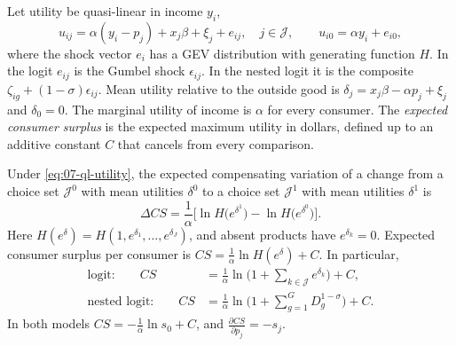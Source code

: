 Let utility be quasi-linear in income $y_i$,
\begin{equation}\label{eq:07-ql-utility}
u_{ij} = \alpha(y_i - p_j) + x_j\beta + \xi_j + e_{ij}, \quad j \in \mathcal{J}, \qquad u_{i0} = \alpha y_i + e_{i0} ,
\end{equation}
where the shock vector $e_i$ has a GEV distribution with generating function $H$. In the logit $e_{ij}$ is the
Gumbel shock $\epsilon_{ij}$. In the nested logit it is the composite $\zeta_{ig} + (1-\sigma)\epsilon_{ij}$. Mean
utility relative to the outside good is $\delta_j = x_j\beta - \alpha p_j + \xi_j$ and $\delta_0 = 0$. The marginal
utility of income is $\alpha$ for every consumer. The \emph{expected consumer surplus} is the expected maximum utility
in dollars, defined up to an additive constant $C$ that cancels from every comparison.

\begin{proposition}\label{prop:07-logsum}
Under \eqref{eq:07-ql-utility}, the expected compensating variation of a change from a choice set
$\mathcal{J}^0$ with mean utilities $\delta^0$ to a choice set $\mathcal{J}^1$ with mean utilities $\delta^1$ is
\begin{equation}\label{eq:07-dcs}
\Delta CS = \frac{1}{\alpha}\Big[\ln H\big(e^{\delta^1}\big) - \ln H\big(e^{\delta^0}\big)\Big].
\end{equation}
Here $H(e^{\delta}) = H(1, e^{\delta_1}, \dots, e^{\delta_J})$, and absent products have $e^{\delta_k} = 0$. Expected
consumer surplus per consumer is $CS = \frac{1}{\alpha}\ln H(e^{\delta}) + C$. In particular,
\begin{align}
\text{logit:}\qquad CS &= \frac{1}{\alpha}\ln\Big(1 + \sum_{k \in \mathcal{J}}e^{\delta_k}\Big) + C, \label{eq:07-cs-logit}\\
\text{nested logit:}\qquad CS &= \frac{1}{\alpha}\ln\Big(1 + \sum_{g=1}^G D_g^{1-\sigma}\Big) + C . \label{eq:07-cs-nl}
\end{align}
In both models $CS = -\frac{1}{\alpha}\ln s_0 + C$, and $\frac{\partial CS}{\partial p_j} = -s_j$.
\end{proposition}

